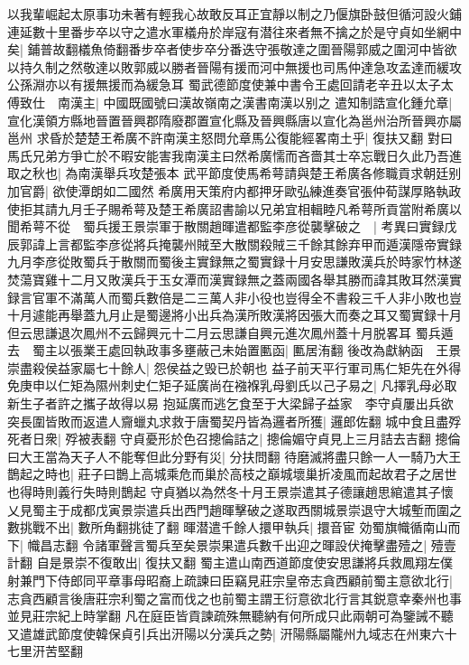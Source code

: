 以我輩崛起太原事功未著有輕我心故敢反耳正宜靜以制之乃偃旗卧鼓但循河設火鋪連延數十里番步卒以守之遣水軍檥舟於岸寇有潜往來者無不擒之於是守貞如坐網中矣|{
	鋪普故翻檥魚倚翻番步卒者使步卒分番迭守張敬達之圍晉陽郭威之圍河中皆欲以持久制之然敬達以敗郭威以勝者晉陽有援而河中無援也司馬仲達急攻孟達而緩攻公孫淵亦以有援無援而為緩急耳}
蜀武德節度使兼中書令王處回請老辛丑以太子太傅致仕　南漢主|{
	中國既國號曰漢故嶺南之漢書南漢以别之}
遣知制誥宣化鍾允章|{
	宣化漢領方縣地晉置晉興郡隋廢郡置宣化縣及晉興縣唐以宣化為邕州治所晉興亦屬邕州}
求昏於楚楚王希廣不許南漢主怒問允章馬公復能經畧南土乎|{
	復扶又翻}
對曰馬氏兄弟方爭亡於不暇安能害我南漢主曰然希廣懦而吝嗇其士卒忘戰日久此乃吾進取之秋也|{
	為南漢舉兵攻楚張本}
武平節度使馬希萼請與楚王希廣各修職貢求朝廷别加官爵|{
	欲使潭朗如二國然}
希廣用天策府内都押牙歐弘練進奏官張仲荀謀厚賂執政使拒其請九月壬子賜希萼及楚王希廣詔書諭以兄弟宜相輯睦凡希萼所貢當附希廣以聞希萼不從　蜀兵援王景崇軍于散關趙暉遣都監李彦從襲擊破之　|{
	考異曰實録戊辰郭諱上言都監李彦從將兵掩襲州賊至大散關殺賊三千餘其餘弃甲而遁漢隱帝實録九月李彦從敗蜀兵于散關而蜀後主實録無之蜀實録十月安思謙敗漢兵於時家竹林遂焚蕩寶雞十二月又敗漢兵于玉女潭而漢實録無之蓋兩國各舉其勝而諱其敗耳然漢實録言官軍不滿萬人而蜀兵數倍是二三萬人非小役也豈得全不書殺三千人非小敗也豈十月遽能再舉蓋九月止是蜀邊將小出兵為漢所敗漢將因張大而奏之耳又蜀實録十月但云思謙退次鳳州不云歸興元十二月云思謙自興元進次鳳州蓋十月脱畧耳}
蜀兵遁去　蜀主以張業王處回執政事多壅蔽己未始置匭函|{
	匭居洧翻}
後改為獻納函　王景崇盡殺侯益家屬七十餘人|{
	怨侯益之毁已於朝也}
益子前天平行軍司馬仁矩先在外得免庚申以仁矩為隰州刺史仁矩子延廣尚在襁褓乳母劉氏以己子易之|{
	凡擇乳母必取新生子者許之攜子故得以易}
抱延廣而逃乞食至于大梁歸子益家　李守貞屢出兵欲突長圍皆敗而返遣人齎蠟丸求救于唐蜀契丹皆為邏者所獲|{
	邏郎佐翻}
城中食且盡殍死者日衆|{
	殍被表翻}
守貞憂形於色召摠倫詰之|{
	摠倫媚守貞見上三月詰去吉翻}
摠倫曰大王當為天子人不能奪但此分野有災|{
	分扶問翻}
待磨滅將盡只餘一人一騎乃大王鵲起之時也|{
	莊子曰鵲上高城乘危而巢於高枝之巔城壞巢折凌風而起故君子之居世也得時則義行失時則鵲起}
守貞猶以為然冬十月王景崇遣其子德讓趙思綰遣其子懷乂見蜀主于成都戊寅景崇遣兵出西門趙暉擊破之遂取西關城景崇退守大城塹而圍之數挑戰不出|{
	數所角翻挑徒了翻}
暉潜遣千餘人擐甲執兵|{
	擐音宦}
効蜀旗幟循南山而下|{
	幟昌志翻}
令諸軍聲言蜀兵至矣景崇果遣兵數千出迎之暉設伏掩擊盡殪之|{
	殪壹計翻}
自是景崇不復敢出|{
	復扶又翻}
蜀主遣山南西道節度使安思謙將兵救鳳翔左僕射兼門下侍郎同平章事母昭裔上疏諫曰臣竊見莊宗皇帝志貪西顧前蜀主意欲北行|{
	志貪西顧言後唐莊宗利蜀之富而伐之也前蜀主謂王衍意欲北行言其鋭意幸秦州也事並見莊宗紀上時掌翻}
凡在庭臣皆貢諫疏殊無聽納有何所成只此兩朝可為鑒誡不聽又遣雄武節度使韓保貞引兵出汧陽以分漢兵之勢|{
	汧陽縣屬隴州九域志在州東六十七里汧苦堅翻}
